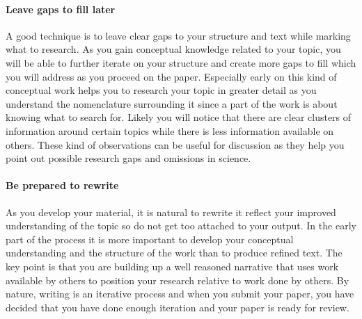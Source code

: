 \paragraph{Leave gaps to fill later}

A good technique is to leave clear gaps to your structure and text while marking what to research.
As you gain conceptual knowledge related to your topic, you will be able to further iterate on your structure and create more gaps to fill which you will address as you proceed on the paper.
Especially early on this kind of conceptual work helps you to research your topic in greater detail as you understand the nomenclature surrounding it since a part of the work is about knowing what to search for.
Likely you will notice that there are clear clusters of information around certain topics while there is less information available on others.
These kind of observations can be useful for discussion as they help you point out possible research gaps and omissions in science.

\paragraph{Be prepared to rewrite}

As you develop your material, it is natural to rewrite it reflect your improved understanding of the topic so do not get too attached to your output.
In the early part of the process it is more important to develop your conceptual understanding and the structure of the work than to produce refined text.
The key point is that you are building up a well reasoned narrative that uses work available by others to position your research relative to work done by others.
By nature, writing is an iterative process and when you submit your paper, you have decided that you have done enough iteration and your paper is ready for review.



